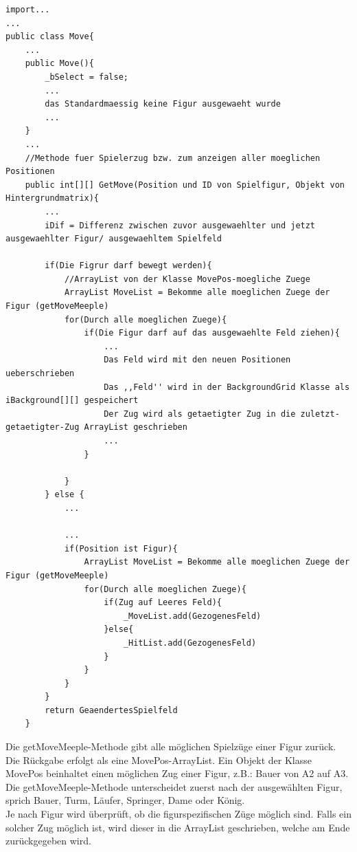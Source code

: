 \documentclass[12pt,a4paper]{article}
\begin{document}
\lstset{language=Java}
\begin{lstlisting}
import...
...
public class Move{
	...
	public Move(){
		_bSelect = false;
		...
		das Standardmaessig keine Figur ausgewaeht wurde
		...
	}			
	...
	//Methode fuer Spielerzug bzw. zum anzeigen aller moeglichen Positionen
	public int[][] GetMove(Position und ID von Spielfigur, Objekt von Hintergrundmatrix){
		...
		iDif = Differenz zwischen zuvor ausgewaehlter und jetzt ausgewaehlter Figur/ ausgewaehltem Spielfeld
		
		if(Die Figrur darf bewegt werden){
			//ArrayList von der Klasse MovePos-moegliche Zuege
			ArrayList MoveList = Bekomme alle moeglichen Zuege der Figur (getMoveMeeple)
			for(Durch alle moeglichen Zuege){
				if(Die Figur darf auf das ausgewaehlte Feld ziehen){
					...
					Das Feld wird mit den neuen Positionen ueberschrieben
					Das ,,Feld'' wird in der BackgroundGrid Klasse als iBackground[][] gespeichert
					Der Zug wird als getaetigter Zug in die zuletzt-getaetigter-Zug ArrayList geschrieben
					...		
				}
				
			}
		} else {
			...
			
			...
			if(Position ist Figur){
				ArrayList MoveList = Bekomme alle moeglichen Zuege der Figur (getMoveMeeple)
				for(Durch alle moeglichen Zuege){
					if(Zug auf Leeres Feld){
						_MoveList.add(GezogenesFeld)
					}else{
						_HitList.add(GezogenesFeld)
					}
				}
			}
		}	
		return GeaendertesSpielfeld		
	}
	\end{lstlisting}
	Die getMoveMeeple-Methode gibt alle möglichen Spielzüge einer Figur zurück. Die Rückgabe erfolgt als eine MovePos-ArrayList. Ein Objekt der Klasse MovePos beinhaltet einen möglichen Zug einer Figur, z.B.: Bauer von A2 auf A3. \\
	Die getMoveMeeple-Methode unterscheidet zuerst nach der ausgewählten Figur, sprich Bauer, Turm, Läufer, Springer, Dame oder König. \\
	Je nach Figur wird überprüft, ob die figurspezifischen Züge möglich sind. Falls ein solcher Zug möglich ist, wird dieser in die ArrayList geschrieben, welche am Ende zurückgegeben wird.
	
\end{document}

